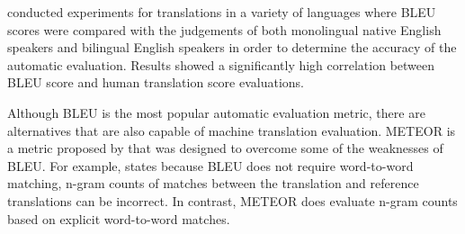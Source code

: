 \cite{papineni_bleu_2001} conducted experiments for translations in a variety of languages where \acrshort{BLEU} scores were compared with the judgements of both monolingual native English speakers and bilingual English speakers in order to determine the accuracy of the automatic evaluation. Results showed a significantly high correlation between \acrshort{BLEU} score and human translation score evaluations.





Although \acrshort{BLEU} is the most popular automatic evaluation metric, there are alternatives that are also capable of machine translation evaluation. \acrfull{METEOR} is a metric proposed by \cite{banerjee_meteor_2005} that was designed to overcome some of the weaknesses of \acrshort{BLEU}. For example, \cite{banerjee_meteor_2005} states because \acrshort{BLEU} does not require word-to-word matching, n-gram counts of matches between the translation and reference translations can be incorrect. In contrast, \acrshort{METEOR} does evaluate n-gram counts based on explicit word-to-word matches. 








